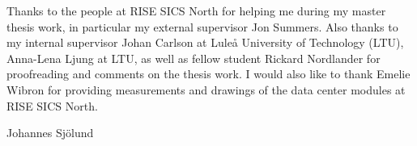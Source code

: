 Thanks to the people at RISE SICS North for helping me during my master thesis work, in particular my external supervisor Jon Summers. Also thanks to my internal supervisor Johan Carlson at Lule\r{a} University of Technology (LTU), Anna-Lena Ljung at LTU, as well as fellow student Rickard Nordlander for proofreading and comments on the thesis work. I would also like to thank Emelie Wibron for providing measurements and drawings of the data center modules at RISE SICS North.

\vspace*{2cm}%
\hfill Johannes Sj{\"o}lund
